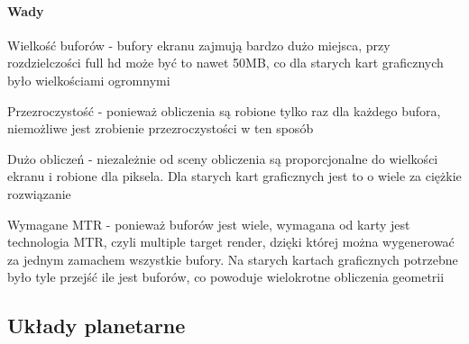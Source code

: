 \paragraph{Wady}

\begin{description}
\item{Wielkość buforów} - bufory ekranu zajmują bardzo dużo miejsca, przy rozdzielczości full hd może być to nawet 50MB, co dla starych kart graficznych było wielkościami ogromnymi
\item{Przezroczystość} - ponieważ obliczenia są robione tylko raz dla każdego bufora, niemożliwe jest zrobienie przezroczystości w ten sposób
\item{Dużo obliczeń} - niezależnie od sceny obliczenia są proporcjonalne do wielkości ekranu i robione dla piksela. Dla starych kart graficznych jest to o wiele za ciężkie rozwiązanie
\item{Wymagane MTR} - ponieważ buforów jest wiele, wymagana od karty jest technologia MTR, czyli multiple target render, dzięki której można wygenerować za jednym zamachem wszystkie bufory. Na starych kartach graficznych potrzebne było tyle przejść ile jest buforów, co powoduje wielokrotne obliczenia geometrii
\end{description}

\subsection{Układy planetarne}\label{sub:uklady planetarne}

